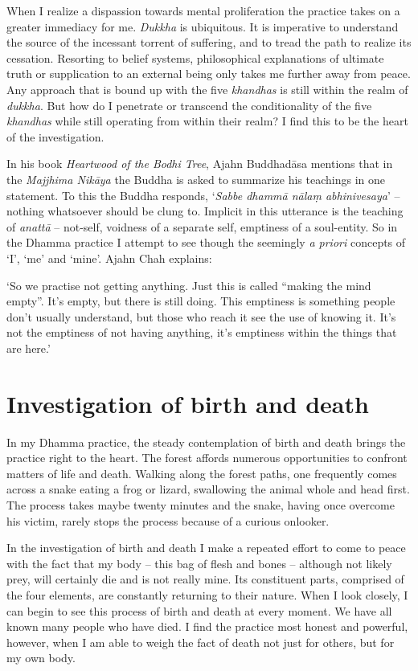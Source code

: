 When I realize a dispassion towards mental proliferation the practice
takes on a greater immediacy for me. \emph{Dukkha} is ubiquitous. It is
imperative to understand the source of the incessant torrent of
suffering, and to tread the path to realize its cessation. Resorting to
belief systems, philosophical explanations of ultimate truth or
supplication to an external being only takes me further away from peace. 
Any approach that is bound up with the five \emph{khandhas} is still
within the realm of \emph{dukkha}. But how do I penetrate or transcend
the conditionality of the five \emph{khandhas} while still operating
from within their realm? I find this to be the heart of the
investigation. 

In his book \emph{Heartwood of the Bodhi Tree}, Ajahn Buddhadāsa
mentions that in the \emph{Majjhima Nikāya} the Buddha is asked to
summarize his teachings in one statement. To this the Buddha responds, 
`\emph{Sabbe dhammā nālaṃ abhinivesaya}' -- nothing whatsoever should
be clung to. Implicit in this utterance is the teaching of \emph{anattā}
-- not-self, voidness of a separate self, emptiness of a soul-entity. So
in the Dhamma practice I attempt to see though the seemingly \emph{a
priori} concepts of `I', `me' and `mine'. Ajahn Chah explains: 

`So we practise not getting anything. Just this is called ``making the
mind empty''. It's empty, but there is still doing. This emptiness is
something people don't usually understand, but those who reach it see
the use of knowing it. It's not the emptiness of not having anything, 
it's emptiness within the things that are here.'

\section{Investigation of birth and death}

In my Dhamma practice, the steady contemplation of birth and death
brings the practice right to the heart. The forest affords numerous
opportunities to confront matters of life and death. Walking along the
forest paths, one frequently comes across a snake eating a frog or
lizard, swallowing the animal whole and head first. The process takes
maybe twenty minutes and the snake, having once overcome his victim, 
rarely stops the process because of a curious onlooker. 

In the investigation of birth and death I make a repeated effort to come
to peace with the fact that my body -- this bag of flesh and bones --
although not likely prey, will certainly die and is not really mine. Its
constituent parts, comprised of the four elements, are constantly
returning to their nature. When I look closely, I can begin to see this
process of birth and death at every moment. We have all known many
people who have died. I find the practice most honest and powerful, 
however, when I am able to weigh the fact of death not just for others, 
but for my own body. 

